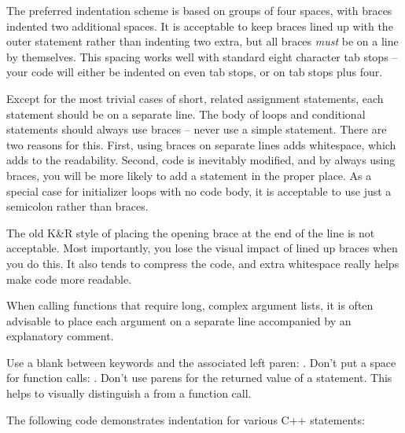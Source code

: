 The preferred indentation scheme is based on groups of four
spaces, with braces indented two additional spaces. It is
acceptable to keep braces lined up with the outer statement
rather than indenting two extra, but all braces \emph{must}
be on a line by themselves. This spacing works well with
standard eight character tab stops -- your code will either
be indented on even tab stops, or on tab stops plus four.

Except for the most trivial cases of short, related assignment
statements, each statement should be on a separate line.
The body of loops and conditional statements should always
use braces -- never use a simple statement. There are two reasons
for this. First, using braces on separate lines adds whitespace,
which adds to the readability. Second, code is inevitably modified,
and by always using braces, you will be more likely to add
a statement in the proper place. As a special case for
initializer loops with no code body, it is acceptable to use just
a semicolon rather than braces.

The old K\&R style of placing the opening brace at the end
of the line is not acceptable. Most importantly, you lose
the visual impact of lined up braces when you do this. It
also tends to compress the code, and extra whitespace really
helps make code more readable.

When calling functions that require long, complex argument
lists, it is often advisable to place each argument on a
separate line accompanied by an explanatory comment.

Use a blank between keywords and the associated left paren:
.  Don't put a space for function calls:
. Don't use parens for the returned
value of a  statement. This helps to visually
distinguish a  from a function call.

The following code demonstrates indentation for various
C++ statements:

